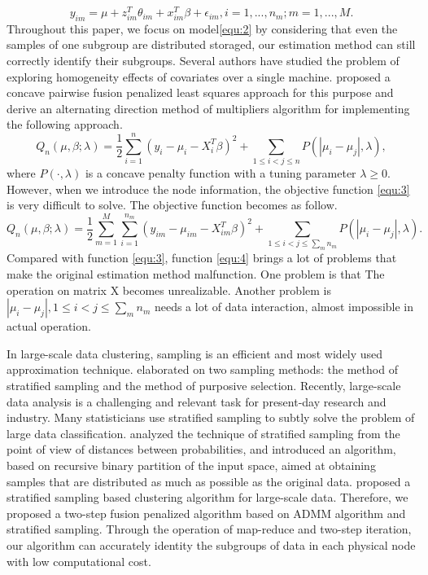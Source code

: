 \documentclass[review]{elsarticle}
\begin{document}
\begin{equation}
\label{equ:2}
y_{im} = \mu+z_{im}^T\theta_{im} + x_{im}^T\beta + \epsilon_{im}, i=1,...,n_m; m=1,...,M.
\end{equation}
Throughout this paper, we focus on model\ref{equ:2} by considering that even the samples of one subgroup are distributed storaged, our estimation method can still correctly identify their subgroups. Several authors have studied the problem of exploring homogeneity effects of covariates over a single machine. \cite{ma2017concave} proposed a concave pairwise fusion penalized least squares approach for this purpose and derive an alternating direction method of multipliers algorithm \cite{boyd2011distributed} for implementing the following approach.
\begin{equation}
\label{equ:3}
Q_n(\mu, \beta;\lambda) = \frac{1}{2}\sum_{i=1}^n(y_i-\mu_i-X_i^T\beta)^2+\sum_{1\leq i<j\leq n}P(|\mu_i-\mu_j|,\lambda),
\end{equation}
where $P(\cdot,\lambda)$ is a concave penalty function with a tuning parameter $\lambda\geq0$. However, when we introduce the node information, the objective function \ref{equ:3} is very difficult to solve. The objective function becomes
as follow.
\begin{equation}
\label{equ:4}
Q_n(\mu, \beta;\lambda) = \frac{1}{2}\sum_{m=1}^M\sum_{i=1}^{n_m}(y_{im}-\mu_{im}-X_{im}^T\beta)^2+\sum_{1\leq i<j\leq \sum_m{n_m}}P(|\mu_{i}-\mu_{j}|,\lambda).
\end{equation}
Compared with function \ref{equ:3}, function \ref{equ:4} brings a lot of problems that make the original estimation method malfunction. One problem is that The operation on matrix X becomes unrealizable. Another problem is $|\mu_i-\mu_j|, 1\leq i<j\leq \sum_m{n_m}$ needs a lot of data interaction, almost impossible in actual operation. 

In large-scale data clustering, sampling is an efficient and most widely used approximation technique. \cite{neyman1934two} elaborated on two sampling methods: the method of stratified sampling and the method of purposive selection. Recently, large-scale data analysis is a challenging and relevant task for present-day research and industry. Many statisticians use stratified sampling to subtly solve the problem of large data classification. \cite{cervellera2018distribution} analyzed the technique of stratified sampling from the point of view of distances between probabilities, and introduced an algorithm, based on recursive binary partition of the input space, aimed at obtaining samples that are distributed as much as possible as the original data.  \cite{zhao2019stratified} proposed a stratified sampling based clustering algorithm for large-scale data.
Therefore, we proposed a two-step fusion penalized algorithm based on ADMM algorithm and stratified sampling. Through the operation of map-reduce and two-step iteration, our algorithm can accurately identity the subgroups of data in each physical node with low computational cost.
\end{document}

